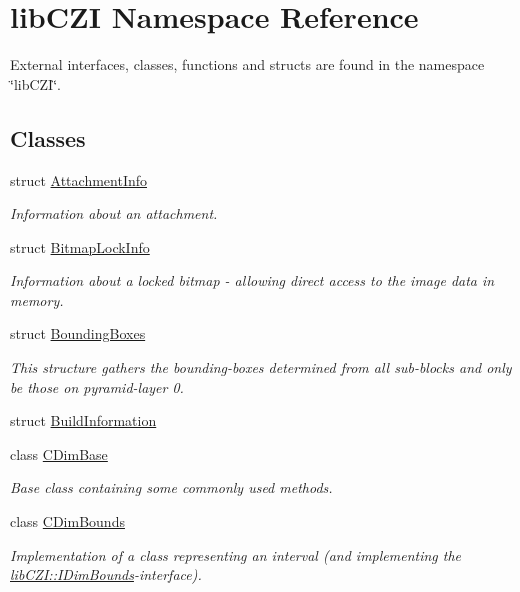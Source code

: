 \hypertarget{namespacelib_c_z_i}{}\section{lib\+C\+ZI Namespace Reference}
\label{namespacelib_c_z_i}


External interfaces, classes, functions and structs are found in the namespace \char`\"{}lib\+C\+Z\+I\char`\"{}.  


\subsection*{Classes}
\begin{DoxyCompactItemize}
\item 
struct \hyperlink{structlib_c_z_i_1_1_attachment_info}{Attachment\+Info}
\begin{DoxyCompactList}\small\item\em Information about an attachment. \end{DoxyCompactList}\item 
struct \hyperlink{structlib_c_z_i_1_1_bitmap_lock_info}{Bitmap\+Lock\+Info}
\begin{DoxyCompactList}\small\item\em Information about a locked bitmap -\/ allowing direct access to the image data in memory. \end{DoxyCompactList}\item 
struct \hyperlink{structlib_c_z_i_1_1_bounding_boxes}{Bounding\+Boxes}
\begin{DoxyCompactList}\small\item\em This structure gathers the bounding-\/boxes determined from all sub-\/blocks and only be those on pyramid-\/layer 0. \end{DoxyCompactList}\item 
struct \hyperlink{structlib_c_z_i_1_1_build_information}{Build\+Information}
\item 
class \hyperlink{classlib_c_z_i_1_1_c_dim_base}{C\+Dim\+Base}
\begin{DoxyCompactList}\small\item\em Base class containing some commonly used methods. \end{DoxyCompactList}\item 
class \hyperlink{classlib_c_z_i_1_1_c_dim_bounds}{C\+Dim\+Bounds}
\begin{DoxyCompactList}\small\item\em Implementation of a class representing an interval (and implementing the {\ttfamily \hyperlink{classlib_c_z_i_1_1_i_dim_bounds}{lib\+C\+Z\+I\+::\+I\+Dim\+Bounds}}-\/interface). \end{DoxyCompactList}\item 

\end{DoxyCompactItemize}
